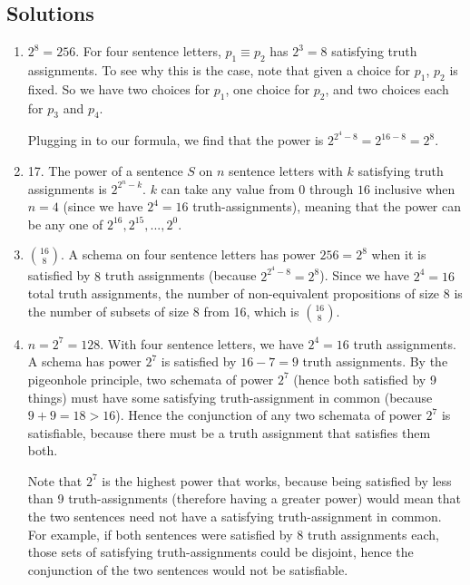 \newpage
\begin{mdframed}[linewidth=1]
\section*{Solutions}
\begin{enumerate}
    \item $2^8 = 256$. For four sentence letters, $p_1 \equiv p_2$ has $2^3 = 8$ satisfying truth assignments. To see why this is the case, note that given a choice for $p_1$, $p_2$ is fixed. So we have two choices for $p_1$, one choice for $p_2$, and two choices each for $p_3$ and $p_4$.

    Plugging in to our formula, we find that the power is $2^{2^4 - 8} = 2^{16 - 8} = 2^8$. 

    \item 17. The power of a sentence $S$ on $n$ sentence letters with $k$ satisfying truth assignments is $2^{2^n - k}$. $k$ can take any value from $0$ through $16$ inclusive when $n = 4$ (since we have $2^4 = 16$ truth-assignments), meaning that the power can be any one of $2^{16}, 2^{15}, ... , 2^0$.

    \item $16 \choose 8$. A schema on four sentence letters has power $256 = 2^8$ when it is satisfied by $8$ truth assignments (because $2^{2^4 - 8} = 2^8$). Since we have $2^4 = 16$ total truth assignments, the number of non-equivalent propositions of size 8 is the number of subsets of size 8 from 16, which is $16 \choose 8$. 

    \item $n = 2^7 = 128$. With four sentence letters, we have $2^4 = 16$ truth assignments. A schema has power $2^7$ is satisfied by $16 - 7 = 9$ truth assignments. By the pigeonhole principle, two schemata of power $2^7$ (hence both satisfied by 9 things) must have some satisfying truth-assignment in common (because $9 + 9 = 18 > 16$). Hence the conjunction of any two schemata of power $2^7$ is satisfiable, because there must be a truth assignment that satisfies them both. 

    Note that $2^7$ is the highest power that works, because being satisfied by less than 9 truth-assignments (therefore having a greater power) would mean that the two sentences need not have a satisfying truth-assignment in common. For example, if both sentences were satisfied by 8 truth assignments each, those sets of satisfying truth-assignments could be disjoint, hence the conjunction of the two sentences would not be satisfiable. 


\end{enumerate}
\end{mdframed}
